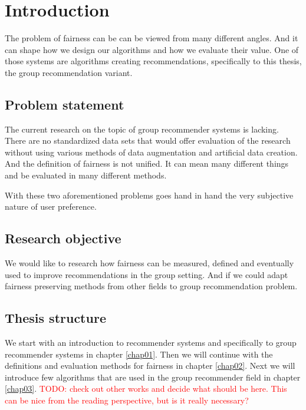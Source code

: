 \chapter*{Introduction}

The problem of fairness can be can be viewed from many different angles. And it can shape how we design our algorithms and how we evaluate their value. One of those systems are algorithms creating recommendations, specifically to this thesis, the group recommendation variant.

\section*{Problem statement}
The current research on the topic of group recommender systems is lacking. There are no standardized data sets that would offer evaluation of the research without using various methods of data augmentation and artificial data creation.
And the definition of fairness is not unified. It can mean many different things and be evaluated in many different methods. 


With these two aforementioned problems goes hand in hand the very subjective nature of user preference.

\section*{Research objective}

We would like to research how fairness can be measured, defined and eventually used to improve recommendations in the group setting. And if we could adapt fairness preserving methods from other fields to group recommendation problem.

\section*{Thesis structure}

We start with an introduction to recommender systems and specifically to group recommender systems in chapter \ref{chap01}. Then we will continue with the definitions and evaluation methods for fairness in chapter \ref{chap02}. Next we will introduce few algorithms that are used in the group recommender field in chapter \ref{chap03}.
\textcolor{red}{TODO: check out other works and decide what should be here. This can be nice from the reading perspective, but is it really necessary?}

